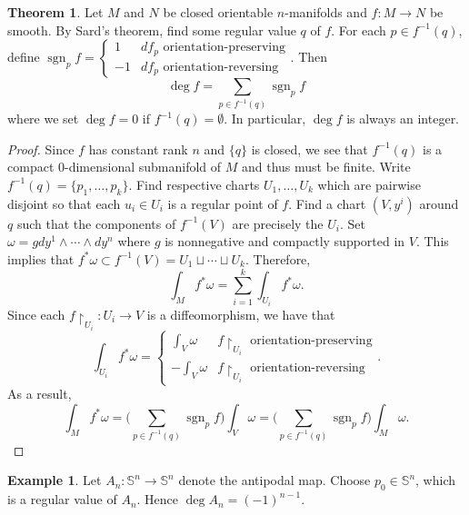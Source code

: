 \documentclass[10pt,letterpaper,cm]{nupset}
\theoremstyle{definition}
\newtheorem{exmp}{Example}
\newtheorem{theorem}{Theorem}
\renewcommand{\S}{\mathbb S}
\newcommand{\1}{\mathbf{1}}
\newcommand{\0}{\vec 0}
\DeclareMathOperator{\sgn}{sgn}
\begin{document}
\begin{theorem}
Let $M$ and $N$ be closed orientable $n$-manifolds and $f: M \to N$ be smooth. By Sard's theorem, find some regular value $q$ of $f$. For each $p\in f^{-1}(q)$, define 
$ \sgn_pf = \begin{cases}
1 & df_p \text{ orientation-preserving} 
\\ -1  & df_p \text{ orientation-reversing} \end{cases}. $  Then $$\deg f = \sum_{p\in f^{-1}(q)} \sgn_pf$$ where we set $\deg f = 0$ if $f^{-1}(q) = \emptyset$.
In particular, $\deg f$ is always an integer. 
\end{theorem}
\begin{proof}
Since $f$ has constant rank $n$ and $\{q\}$ is closed, we see that $f^{-1}(q)$ is a compact $0$-dimensional submanifold  of $M$ and thus must be finite. Write $f^{-1}(q) = \{p_1, \ldots, p_k\}$. Find respective charts $U_1, \ldots, U_k$ which are pairwise disjoint so that each $u_i \in U_i$ is a regular point of $f$. Find a chart $(V, y^i)$ around $q$ such that the components of $f^{-1}(V)$ are precisely the $U_i$. Set $\omega = gdy^1 \wedge \cdots \wedge dy^n$ where $g$ is nonnegative and compactly supported in $V$. This implies that $f^{\ast}\omega \subset f^{-1}(V) =U_1 \sqcup \cdots \sqcup U_k$. Therefore, $$  \int_Mf^{\ast}\omega =\sum_{i=1}^k\int_{U_i}f^{\ast}\omega .$$ Since each $f\restriction_{U_i} : U_i \to V$ is a diffeomorphism, we have that $$ \int_{U_i}f^{\ast}\omega =
\begin{cases}
\int_{V} \omega & f\restriction_{U_i}  \text{ orientation-preserving} 
\\ -\int_V\omega  & f\restriction_{U_i} \text{ orientation-reversing}
\end{cases} .$$ As a result, $$\int_M f^{\ast} \omega  =\big (\sum_{p\in f^{-1}(q)} \sgn_pf \big)\int_V \omega =\big (\sum_{p\in f^{-1}(q)} \sgn_pf \big )\int_M \omega .$$
\end{proof}

\begin{exmp}
Let $A_n: \S^n \to \S^n$ denote the antipodal map. Choose $p_0 \in \S^n$, which is a regular value of $A_n$. Hence $\deg A_n = (-1)^{n-1}$.
\end{exmp}
\end{document}
